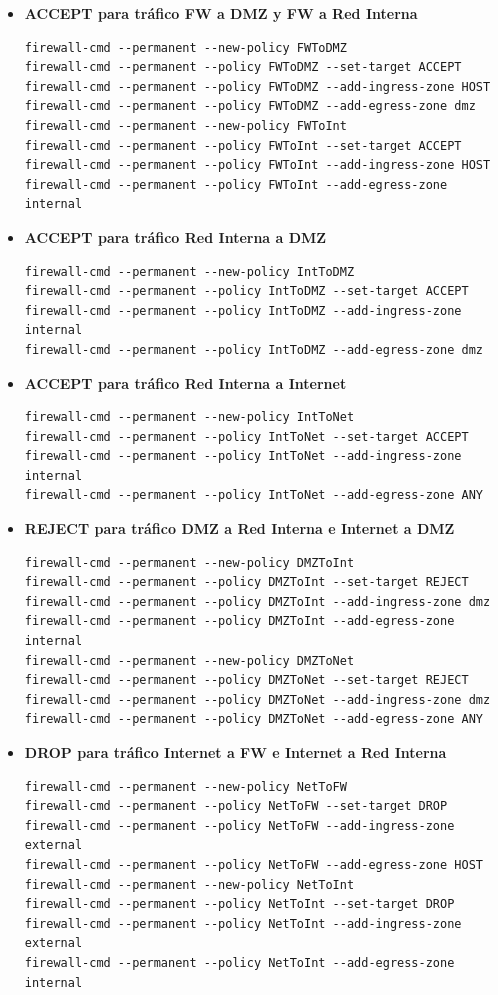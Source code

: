 \documentclass[11pt]{report}
\begin{document}
\begin{itemize}
  \item \textbf{ACCEPT para tráfico FW a DMZ y FW a Red Interna}
  \begin{verbatim}
firewall-cmd --permanent --new-policy FWToDMZ
firewall-cmd --permanent --policy FWToDMZ --set-target ACCEPT
firewall-cmd --permanent --policy FWToDMZ --add-ingress-zone HOST
firewall-cmd --permanent --policy FWToDMZ --add-egress-zone dmz
firewall-cmd --permanent --new-policy FWToInt
firewall-cmd --permanent --policy FWToInt --set-target ACCEPT
firewall-cmd --permanent --policy FWToInt --add-ingress-zone HOST
firewall-cmd --permanent --policy FWToInt --add-egress-zone internal
  \end{verbatim}

  \item \textbf{ACCEPT para tráfico Red Interna a DMZ}
  \begin{verbatim}
firewall-cmd --permanent --new-policy IntToDMZ
firewall-cmd --permanent --policy IntToDMZ --set-target ACCEPT
firewall-cmd --permanent --policy IntToDMZ --add-ingress-zone internal
firewall-cmd --permanent --policy IntToDMZ --add-egress-zone dmz
  \end{verbatim}

  \item \textbf{ACCEPT para tráfico Red Interna a Internet}
  \begin{verbatim}
firewall-cmd --permanent --new-policy IntToNet
firewall-cmd --permanent --policy IntToNet --set-target ACCEPT
firewall-cmd --permanent --policy IntToNet --add-ingress-zone internal
firewall-cmd --permanent --policy IntToNet --add-egress-zone ANY
  \end{verbatim}

  \item \textbf{REJECT para tráfico DMZ a Red Interna e Internet a DMZ}
  \begin{verbatim}
firewall-cmd --permanent --new-policy DMZToInt
firewall-cmd --permanent --policy DMZToInt --set-target REJECT
firewall-cmd --permanent --policy DMZToInt --add-ingress-zone dmz
firewall-cmd --permanent --policy DMZToInt --add-egress-zone internal
firewall-cmd --permanent --new-policy DMZToNet
firewall-cmd --permanent --policy DMZToNet --set-target REJECT
firewall-cmd --permanent --policy DMZToNet --add-ingress-zone dmz
firewall-cmd --permanent --policy DMZToNet --add-egress-zone ANY
  \end{verbatim}

  \item \textbf{DROP para tráfico Internet a FW e Internet a Red Interna}
  \begin{verbatim}
firewall-cmd --permanent --new-policy NetToFW
firewall-cmd --permanent --policy NetToFW --set-target DROP
firewall-cmd --permanent --policy NetToFW --add-ingress-zone external
firewall-cmd --permanent --policy NetToFW --add-egress-zone HOST
firewall-cmd --permanent --new-policy NetToInt
firewall-cmd --permanent --policy NetToInt --set-target DROP
firewall-cmd --permanent --policy NetToInt --add-ingress-zone external
firewall-cmd --permanent --policy NetToInt --add-egress-zone internal
  \end{verbatim}
\end{itemize}
\end{document}
